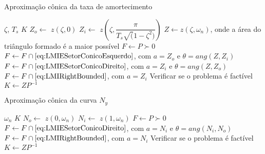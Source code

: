 \begin{algorithm}[hbt!]
  \caption{Aproximação cônica da taxa de amortecimento}\label{alg:AproximacaoConicaZeta}
  \begin{algorithmic}[1]
    \Require $\zeta$, $T_s$
    \Ensure $K$
    \State $Z_o \gets $ $z(\zeta,0)$
    \State $Z_i \gets $ $z\left(\zeta,\dfrac{\pi}{T_s\sqrt(1-\zeta^2)}\right)$
    \State $Z \gets z(\zeta,\omega_n)$, onde a área do triângulo formado é a maior possível
    \State $F \gets P \succ 0$
    \State $F \gets F \cap \eqref{eq:LMIESetorConicoEsquerdo}$, com $a = Z_o$ e $\theta = ang(Z,Z_i)$ 
    \State $F \gets F \cap \eqref{eq:LMIESetorConicoDireito}$, com $a = Z_i$ e $\theta = ang(Z,Z_o)$ 
    \State $F \gets F \cap \eqref{eq:LMIRightBounded}$, com $a = Z_i$  
    \State Verificar se o problema é factível
    \State $K \gets ZP^{-1}$
  \end{algorithmic}
\end{algorithm}

\begin{algorithm}[hbt!]
  \caption{Aproximação cônica da curva $N_y$}\label{alg:AproximacaoConicaNy}
  \begin{algorithmic}[1]
    \Require $\omega_n$
    \Ensure $K$
    \State $N_o \gets $ $z(0,\omega_n)$
    \State $N_i \gets $ $z(1,\omega_n)$
    \State $F \gets P \succ 0$
    \State $F \gets F \cap \eqref{eq:LMIESetorConicoDireito}$, com $a = N_i$ e $\theta = ang(N_i,N_o)$ 
    \State $F \gets F \cap \eqref{eq:LMIRightBounded}$, com $a = N_i$ 
    \State Verificar se o problema é factível
    \State $K \gets ZP^{-1}$
  \end{algorithmic}
\end{algorithm}